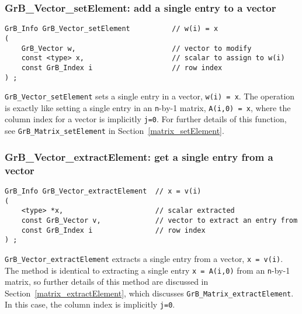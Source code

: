 \documentclass[12pt]{article}
\begin{document}
\subsubsection{{\sf GrB\_Vector\_setElement:}    add a single entry to a vector}
\label{vector_setElement}

\begin{mdframed}[userdefinedwidth=6in]
{\footnotesize
\begin{verbatim}
GrB_Info GrB_Vector_setElement          // w(i) = x
(
    GrB_Vector w,                       // vector to modify
    const <type> x,                     // scalar to assign to w(i)
    const GrB_Index i                   // row index
) ;
\end{verbatim} } \end{mdframed}

\verb'GrB_Vector_setElement' sets a single entry in a vector, \verb'w(i) = x'.
The operation is exactly like setting a single entry in an \verb'n'-by-1
matrix, \verb'A(i,0) = x', where the column index for a vector is implicitly
\verb'j=0'.  For further details of this function, see
\verb'GrB_Matrix_setElement' in Section~\ref{matrix_setElement}. 

\subsubsection{{\sf GrB\_Vector\_extractElement:} get a single entry from a vector}
\label{vector_extractElement}

\begin{mdframed}[userdefinedwidth=6in]
{\footnotesize
\begin{verbatim}
GrB_Info GrB_Vector_extractElement  // x = v(i)
(
    <type> *x,                      // scalar extracted
    const GrB_Vector v,             // vector to extract an entry from
    const GrB_Index i               // row index
) ;
\end{verbatim} } \end{mdframed}

\verb'GrB_Vector_extractElement' extracts a single entry from a vector,
\verb'x = v(i)'.  The method is identical to extracting a single entry
\verb'x = A(i,0)' from an \verb'n'-by-1 matrix, so further details of this
method are discussed in Section~\ref{matrix_extractElement}, which discusses
\verb'GrB_Matrix_extractElement'.  In this case, the column index is implicitly
\verb'j=0'.
\end{document}
